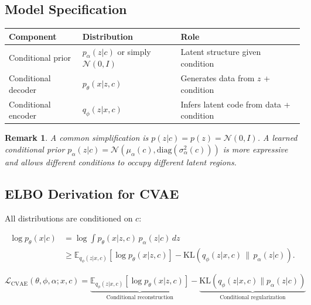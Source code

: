 \documentclass{article}
\newtheorem{remark}{Remark}
\begin{document}
\subsection{Model Specification}

\begin{center}
\renewcommand{\arraystretch}{1.4}
\begin{tabular}{lll}
\toprule
\textbf{Component} & \textbf{Distribution} & \textbf{Role} \\
\midrule
Conditional prior & $p_\alpha(z|c)$ or simply $\mathcal{N}(0,I)$ & Latent structure given condition \\
Conditional decoder & $p_\theta(x|z, c)$ & Generates data from $z$ + condition \\
Conditional encoder & $q_\phi(z|x, c)$ & Infers latent code from data + condition \\
\bottomrule
\end{tabular}
\end{center}

\begin{remark}
A common simplification is $p(z|c) = p(z) = \mathcal{N}(0,I)$. A \emph{learned} conditional prior $p_\alpha(z|c) = \mathcal{N}(\mu_\alpha(c), \mathrm{diag}(\sigma^2_\alpha(c)))$ is more expressive and allows different conditions to occupy different latent regions.
\end{remark}

\subsection{ELBO Derivation for CVAE}

All distributions are conditioned on $c$:

\begin{align}
\log p_\theta(x|c)
&= \log \int p_\theta(x|z,c)\,p_\alpha(z|c)\,dz \nonumber \\
&\geq \mathbb{E}_{q_\phi(z|x,c)}\!\left[\log p_\theta(x|z,c)\right] - \mathrm{KL}\!\left(q_\phi(z|x,c) \,\|\, p_\alpha(z|c)\right). \label{eq:cvae-elbo}
\end{align}

\[
\boxed{
    \mathcal{L}_{\mathrm{CVAE}}(\theta,\phi,\alpha; x, c)
    = \underbrace{\mathbb{E}_{q_\phi(z|x,c)}[\log p_\theta(x|z,c)]}_{\text{Conditional reconstruction}}
    - \underbrace{\mathrm{KL}(q_\phi(z|x,c) \| p_\alpha(z|c))}_{\text{Conditional regularization}}
}
\]
\end{document}
